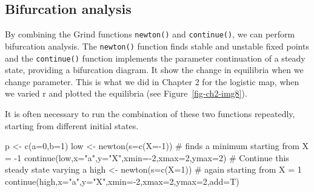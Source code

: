 \documentclass[
  a4paper,
  DIV=11,
  numbers=noendperiod,
  oneside]{scrreprt}
\newenvironment{Shaded}{\begin{snugshade}}{\end{snugshade}}
\newcommand{\AttributeTok}[1]{\textcolor[rgb]{0.40,0.45,0.13}{#1}}
\newcommand{\CommentTok}[1]{\textcolor[rgb]{0.37,0.37,0.37}{#1}}
\newcommand{\DecValTok}[1]{\textcolor[rgb]{0.68,0.00,0.00}{#1}}
\newcommand{\FunctionTok}[1]{\textcolor[rgb]{0.28,0.35,0.67}{#1}}
\newcommand{\NormalTok}[1]{\textcolor[rgb]{0.00,0.23,0.31}{#1}}
\newcommand{\OtherTok}[1]{\textcolor[rgb]{0.00,0.23,0.31}{#1}}
\newcommand{\SpecialCharTok}[1]{\textcolor[rgb]{0.37,0.37,0.37}{#1}}
\newcommand{\StringTok}[1]{\textcolor[rgb]{0.13,0.47,0.30}{#1}}
\begin{document}
\hypertarget{sec-Bifurcation-analysis}{%
\subsection{Bifurcation analysis}\label{sec-Bifurcation-analysis}}

By combining the Grind functions \texttt{newton()} and
\texttt{continue()}, we can perform bifurcation analysis. The
\texttt{newton()} function finds stable and unstable fixed points and
the \texttt{continue()} function implements the parameter continuation
of a steady state, providing a bifurcation diagram. It show the change
in equilibria when we change parameter. This is what we did in Chapter 2
for the logistic map, when we varied r and plotted the equilibria (see
Figure~\ref{fig-ch2-img8}).

It is often necessary to run the combination of these two functions
repeatedly, starting from different initial states.

\begin{Shaded}
\begin{Highlighting}[]
\NormalTok{p }\OtherTok{\textless{}{-}} \FunctionTok{c}\NormalTok{(}\AttributeTok{a=}\DecValTok{0}\NormalTok{,}\AttributeTok{b=}\DecValTok{1}\NormalTok{)}
\NormalTok{low }\OtherTok{\textless{}{-}} \FunctionTok{newton}\NormalTok{(}\AttributeTok{s=}\FunctionTok{c}\NormalTok{(}\AttributeTok{X=}\SpecialCharTok{{-}}\DecValTok{1}\NormalTok{)) }\CommentTok{\# finds a minimum starting from X = {-}1}
\FunctionTok{continue}\NormalTok{(low,}\AttributeTok{x=}\StringTok{"a"}\NormalTok{,}\AttributeTok{y=}\StringTok{"X"}\NormalTok{,}\AttributeTok{xmin=}\SpecialCharTok{{-}}\DecValTok{2}\NormalTok{,}\AttributeTok{xmax=}\DecValTok{2}\NormalTok{,}\AttributeTok{ymax=}\DecValTok{2}\NormalTok{) }\CommentTok{\# Continue this steady state varying a}
\NormalTok{high }\OtherTok{\textless{}{-}} \FunctionTok{newton}\NormalTok{(}\AttributeTok{s=}\FunctionTok{c}\NormalTok{(}\AttributeTok{X=}\DecValTok{1}\NormalTok{)) }\CommentTok{\# again starting from X = 1}
\FunctionTok{continue}\NormalTok{(high,}\AttributeTok{x=}\StringTok{"a"}\NormalTok{,}\AttributeTok{y=}\StringTok{"X"}\NormalTok{,}\AttributeTok{xmin=}\SpecialCharTok{{-}}\DecValTok{2}\NormalTok{,}\AttributeTok{xmax=}\DecValTok{2}\NormalTok{,}\AttributeTok{ymax=}\DecValTok{2}\NormalTok{,}\AttributeTok{add=}\NormalTok{T)}
\end{Highlighting}
\end{Shaded}
\end{document}
